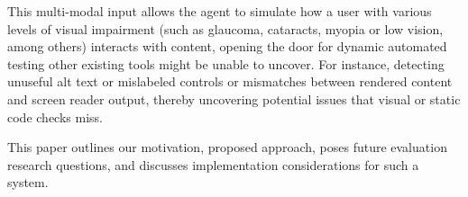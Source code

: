 This multi-modal input allows the agent to simulate how a user with various levels of visual impairment (such as glaucoma, cataracts, myopia or low vision, among others) interacts with content, opening the door for dynamic automated testing other existing tools might be unable to uncover. For instance, detecting unuseful alt text or mislabeled controls or mismatches between rendered content and screen reader output, thereby uncovering potential issues that visual or static code checks miss. 

This paper outlines our motivation, proposed approach, poses future evaluation research questions, and discusses implementation considerations for such a system.
